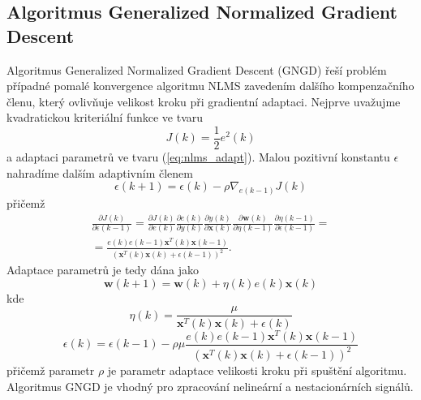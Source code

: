 \subsection{Algoritmus Generalized Normalized Gradient Descent}\label{chap:gngd}
Algoritmus Generalized Normalized Gradient Descent (GNGD) řeší problém případné pomalé konvergence algoritmu NLMS zavedením dalšího kompenzačního členu, který ovlivňuje velikost kroku při gradientní adaptaci. Nejprve uvažujme kvadratickou kriteriální funkce ve tvaru
\begin{equation}
    J(k)=\frac{1}{2}e^2(k)
\end{equation}
a adaptaci parametrů ve tvaru (\ref{eq:nlms_adapt}). Malou pozitivní konstantu $\epsilon$ nahradíme dalším adaptivním členem
\begin{equation}
    \epsilon(k+1)=\epsilon(k)-\rho \nabla_{e(k-1)}J(k)
\end{equation}
přičemž
\begin{multline}
    \frac{\partial J(k)}{\partial \epsilon(k-1)}=\frac{\partial J(k)}{\partial e(k)}\frac{\partial e(k)}{\partial y(k)}\frac{\partial y(k)}{\partial \textbf{x}(k)}\frac{\partial \textbf{w}(k)}{\partial \eta(k-1)}\frac{\partial \eta(k-1)}{\partial \epsilon(k-1)}= \\
    =\frac{e(k)e(k-1)\textbf{x}^T(k)\textbf{x}(k-1)}{(\textbf{x}^T(k)\textbf{x}(k)+\epsilon(k-1))^2}.
\end{multline}
Adaptace parametrů je tedy dána jako
\begin{equation}
    \textbf{w}(k+1)=\textbf{w}(k)+\eta(k)e(k)\textbf{x}(k)
\end{equation}
kde
\begin{equation}
    \eta(k)=\frac{\mu}{\textbf{x}^T(k)\textbf{x}(k)+\epsilon(k)}
\end{equation}
\begin{equation}
    \epsilon(k)=\epsilon(k-1)-\rho\mu\frac{e(k)e(k-1)\textbf{x}^T(k)\textbf{x}(k-1)}{(\textbf{x}^T(k)\textbf{x}(k)+\epsilon(k-1))^2}
\end{equation}
přičemž parametr $\rho$ je parametr adaptace velikosti kroku při spuštění algoritmu. Algoritmus GNGD je vhodný pro zpracování nelineární a nestacionárních signálů.


